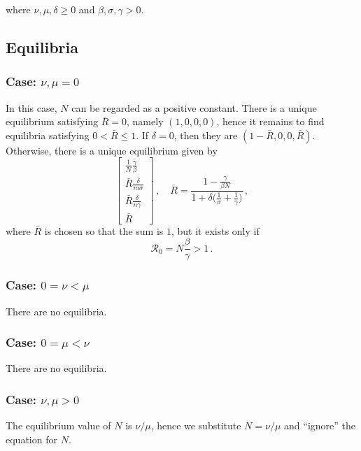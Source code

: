 \documentclass[fleqn]{article}
\begin{document}
where $\nu,\mu,\delta \geq 0$ and $\beta,\sigma,\gamma > 0$.

\subsection{Equilibria}

\subsubsection{Case: $\nu, \mu = 0$}

In this case, $N$ can be regarded as a positive constant.
There is a unique equilibrium satisfying $\bar{R} = 0$,
namely $(1, 0, 0, 0)$,
hence it remains to find equilibria satisfying $0 < \bar{R} \leq 1$.
If $\delta = 0$, then they are $(1 - \bar{R}, 0, 0, \bar{R})$.
Otherwise, there is a unique equilibrium given by
\begin{equation}
\begin{bmatrix}
  \frac{1}{N} \frac{\gamma}{\beta} \\
  \bar{R} \frac{\delta}{m \sigma} \\
  \bar{R} \frac{\delta}{n \gamma} \\
  \bar{R}
\end{bmatrix}
\,,\quad
\bar{R} = \frac{1 - \frac{\gamma}{\beta N}}{1 + \delta \big(\frac{1}{\sigma} + \frac{1}{\gamma}\big)}\,,
\end{equation}
where $\bar{R}$ is chosen so that the sum is $1$, but it exists only if
\begin{equation}
\mathcal{R}_{0} = N \frac{\beta}{\gamma} > 1\,.
\end{equation}

\subsubsection{Case: $0 = \nu < \mu$}

There are no equilibria.

\subsubsection{Case: $0 = \mu < \nu$}

There are no equilibria.

\subsubsection{Case: $\nu, \mu > 0$}

The equilibrium value of $N$ is $\nu / \mu$, hence we substitute
$N = \nu / \mu$ and ``ignore'' the equation for $N$.
\end{document}
